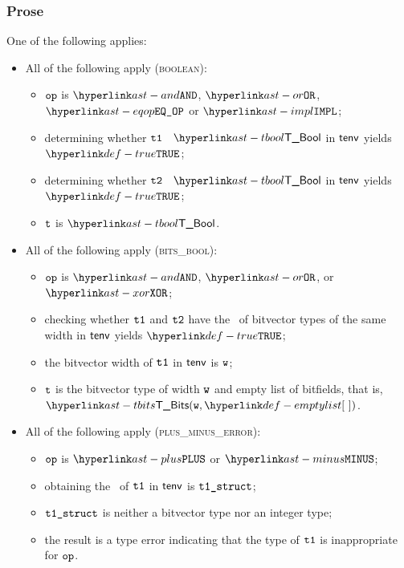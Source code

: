\subsubsection{Prose}
One of the following applies:
\begin{itemize}
  \item All of the following apply (\textsc{boolean}):
  \begin{itemize}
    \item $\texttt{op}$ is $\AND$, $\OR$, $\EQOP$ or $\IMPL$;
    \item determining whether $\texttt{t1}$ \typesatisfies\ $\TBool$ in $\textsf{tenv}$ yields $\True$\ProseOrTypeError;
    \item determining whether $\texttt{t2}$ \typesatisfies\ $\TBool$ in $\textsf{tenv}$ yields $\True$\ProseOrTypeError;
    \item $\texttt{t}$ is $\TBool$.
  \end{itemize}

  \item All of the following apply (\textsc{bits\_bool}):
  \begin{itemize}
    \item $\texttt{op}$ is $\AND$, $\OR$, or $\XOR$;
    \item checking whether $\texttt{t1}$ and $\texttt{t2}$ have the \structure\ of bitvector types
          of the same width in $\textsf{tenv}$ yields $\True$\ProseOrTypeError;
    \item the bitvector width of $\texttt{t1}$ in $\textsf{tenv}$ is $\texttt{w}$;
    \item $\texttt{t}$ is the bitvector type of width $\texttt{w}$ and empty list of bitfields, that is, \\ $\TBits(\vw, \emptylist)$.
  \end{itemize}

  \item All of the following apply (\textsc{plus\_minus\_error}):
  \begin{itemize}
    \item $\texttt{op}$ is $\PLUS$ or $\MINUS$;
    \item obtaining the \structure\ of $\texttt{t1}$ in $\textsf{tenv}$ is $\texttt{t1\_struct}$\ProseOrTypeError;
    \item $\texttt{t1\_struct}$ is neither a bitvector type nor an integer type;
    \item the result is a type error indicating that the type of $\texttt{t1}$ is inappropriate for $\texttt{op}$.
  \end{itemize}


\end{itemize}
